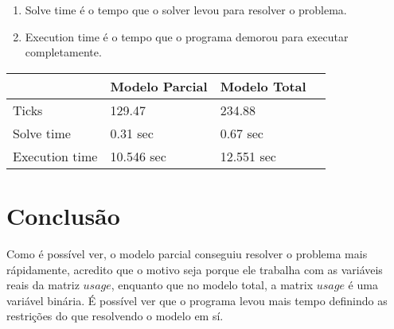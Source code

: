 \documentclass{article}
\begin{document}
    \begin{enumerate}
        \item Solve time é o tempo que o solver levou para resolver o problema.
        \item Execution time é o tempo que o programa demorou para executar completamente.
    \end{enumerate}

    \begin{center}
        \begin{tabular}{ | l | l | l | p{5cm} |}
            \hline
             & Modelo Parcial & Modelo Total \\ \hline
            Ticks & 129.47 & 234.88 \\
            Solve time & 0.31 sec & 0.67 sec \\
            Execution time & 10.546 sec & 12.551 sec \\
            \hline
        \end{tabular}
    \end{center}

    \section{Conclusão}
    Como é possível ver, o modelo parcial conseguiu resolver o problema mais rápidamente, acredito que o motivo seja porque ele trabalha
    com as variáveis reais da matriz $usage$, enquanto que no modelo total, a matrix $usage$ é uma variável binária.
    É possível ver que o programa levou mais tempo definindo as restrições do que resolvendo o modelo em sí.
\end{document}
